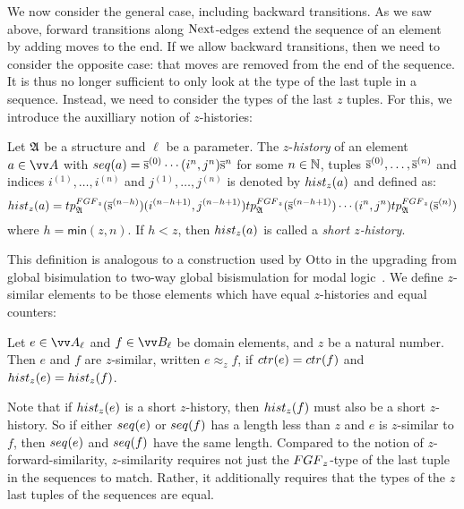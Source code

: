 We now consider the general case, including backward transitions.
As we saw above, forward transitions along $\mathrm{Next}$-edges extend the sequence of an element by adding moves to the end.
If we allow backward transitions, then we need to consider the opposite case: that moves are removed from the end of the sequence.
It is thus no longer sufficient to only look at the type of the last tuple in a sequence.
Instead, we need to consider the types of the last $z$ tuples.
For this, we introduce the auxilliary notion of $z$-histories:
\begin{definition}[$z$-history]
  Let ${\mathfrak{A}}$ be a structure and $\ell$ be a parameter.
  The $z$-\emph{history} of an element $a \in \unraveldom{A}$ with $\seq{a} = \elemtuples^{(0)} \cdots (i^{n}, j^{n})\elemtuples^{n}$ for some $n \in {\mathbb{N}}$, tuples $\overline{\mathrm{s}}^{(0)}, \ldots, \overline{\mathrm{s}}^{(n)}$ and indices $i^{(1)}, \ldots, i^{(n)}$ and $j^{(1)}, \ldots, j^{(n)}$ is denoted by $\hist{z}{a}$ and defined as:
  \begin{equation*}
    \hist{z}{a} = \tp{\FGF_{z}}{\str{A}}{\elemtuples^{(n-h)}}(i^{(n-h+1)}, j^{(n-h+1)})\tp{\FGF_{z}}{\str{A}}{\elemtuples^{(n-h+1)}}\cdots(i^{n}, j^{n})\tp{\FGF_{z}}{\str{A}}{\elemtuples^{(n)}}
  \end{equation*}
  where $h = \mathsf{min}(z, n)$. If $h < z$, then $\hist{z}{a}$ is called a \emph{short $z$-history}.
\end{definition}
This definition is analogous to a construction used by Otto in the upgrading from global bisimulation to two-way global bisismulation for modal logic~\cite[Def. 39]{Otto04}.
We define $z$-similar elements to be those elements which have equal $z$-histories and equal counters:
\begin{definition}
 Let $e \in \unraveldom{A}_{\ell}$ and $f \in \unraveldom{B}_{\ell}$ be domain elements, and $z$ be a natural number. Then $e$ and $f$ are $z$-similar, written $e \approx_{z} f$, if $\ctr{e} = \ctr{f}$ and $\hist{z}{e} = \hist{z}{f}$.
\end{definition}
Note that if $\hist{z}{e}$ is a short $z$-history, then $\hist{z}{f}$ must also be a short $z$-history.
So if either $\seq{e}$ or $\seq{f}$ has a length less than $z$ and $e$ is $z$-similar to $f$, then $\seq{e}$ and $\seq{f}$ have the same length.
Compared to the notion of $z$-forward-similarity, $z$-similarity requires not just the $\FGF_{z}$-type of the last tuple in the sequences to match.
Rather, it additionally requires that the types of the $z$ last tuples of the sequences are equal.

